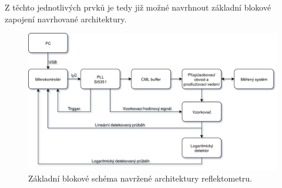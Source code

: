Z těchto jednotlivých prvků je tedy již možné navrhnout základní blokové zapojení navrhované architektury.

\begin{figure}[htbp]\includegraphics[width=\textwidth,keepaspectratio]{images/reflectometer_blockdiagram_simple.png}\caption{Základní blokové schéma navržené architektury reflektometru.}\label{reflectometer_blockdiagram}\end{figure}